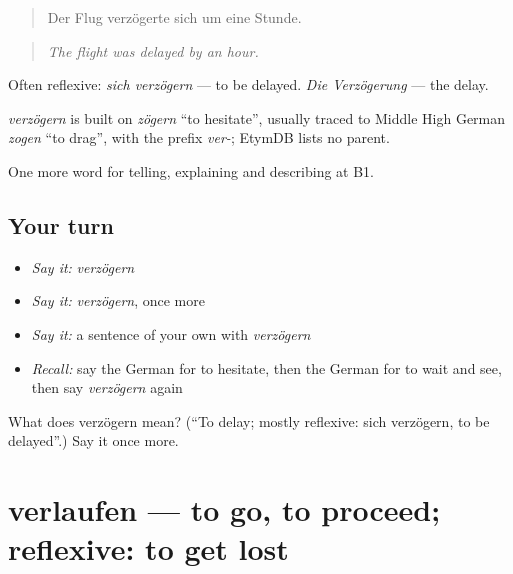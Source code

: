 \begin{quote}
Der Flug verzögerte sich um eine Stunde.
\end{quote}

\begin{quote}
\emph{The flight was delayed by an hour.}
\end{quote}

Often reflexive: \emph{sich verzögern} — to be delayed. \emph{Die Verzögerung} — the delay.

\begin{cousinweb}
\emph{verzögern} is built on \emph{zögern} \textquotedblleft{}to hesitate\textquotedblright{}, usually traced to Middle High German \emph{zogen} \textquotedblleft{}to drag\textquotedblright{}, with the prefix \emph{ver-}; EtymDB lists no parent.
\end{cousinweb}

\begin{grammarlens}[title={What you've built}]
One more word for telling, explaining and describing at B1.
\end{grammarlens}

\subsection*{Your turn}
\begin{itemize}
\raggedright
  \item \emph{Say it:} \emph{verzögern}
  \item \emph{Say it:} \emph{verzögern}, once more
  \item \emph{Say it:} a sentence of your own with \emph{verzögern}
  \item \emph{Recall:} say the German for to hesitate, then the German for to wait and see, then say \emph{verzögern} again
\end{itemize}

\begin{tcolorbox}[breakable,colback=teal!4,colframe=teal!35!black,title={Before you move on}]
What does verzögern mean? (\textquotedblleft{}To delay; mostly reflexive: sich verzögern, to be delayed\textquotedblright{}.) Say it once more.
\end{tcolorbox}
\section[verlaufen]{verlaufen — to go, to proceed; reflexive: to get lost}

\label{lesson:GE-C270-verlaufen}



